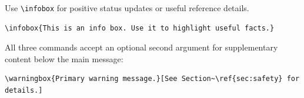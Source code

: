 Use \texttt{\textbackslash infobox} for positive status updates or useful reference details.


\begin{verbatim}
\infobox{This is an info box. Use it to highlight useful facts.}
\end{verbatim}

All three commands accept an optional second argument for supplementary content below the main message:

\begin{verbatim}
\warningbox{Primary warning message.}[See Section~\ref{sec:safety} for details.]
\end{verbatim}
